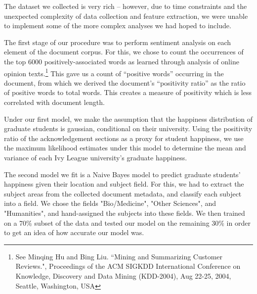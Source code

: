 The dataset we collected is very rich -- however, due to time constraints and the unexpected complexity of data collection and feature extraction, we were unable to implement some of the more complex analyses we had hoped to include.

The first stage of our procedure was to perform sentiment analysis on each element of the document corpus. For this, we chose to count the occurrences of the top 6000 positively-associated words as learned through analysis of online opinion texts.\footnote{See Minqing Hu and Bing Liu. ``Mining and Summarizing Customer Reviews.", Proceedings of the ACM SIGKDD International Conference on Knowledge, Discovery and Data Mining (KDD-2004), Aug 22-25, 2004, Seattle, Washington, USA} This gave us a count of ``positive words'' occurring in the document, from which we derived the document's ``positivity ratio'' as the ratio of positive words to total words. This creates a measure of positivity which is less correlated with document length.

Under our first model, we make the assumption that the happiness distribution of graduate students is gaussian, conditional on their university. Using the positivity ratio of the acknowledgement sections as a proxy for student happiness, we use the maximum likelihood estimates under this model to determine the mean and variance of each Ivy League university's graduate happiness.

The second model we fit is a Naive Bayes model to predict graduate students' happiness given their location and subject field. For this, we had to extract the subject areas from the collected document metadata, and classify each subject into a field. We chose the fields "Bio/Medicine", "Other Sciences", and "Humanities", and hand-assigned the subjects into these fields. We then trained on a 70\% subset of the data and tested our model on the remaining 30\% in order to get an idea of how accurate our model was.